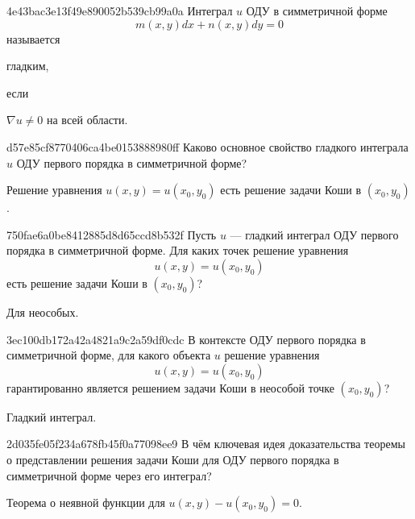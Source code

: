 \begin{note}{4e43bac3e13f49e890052b539cb99a0a}
    Интеграл \({ u }\) ОДУ в симметричной форме
    \[
        m(x, y) dx + n(x, y) dy = 0
    \]
    называется \begin{icloze}{2}гладким,\end{icloze} если \begin{icloze}{1}\({ \nabla u \neq 0 }\) на всей области.\end{icloze}
\end{note}

\begin{note}{d57e85cf8770406ca4be0153888980ff}
    Каково основное свойство гладкого интеграла \({ u }\) ОДУ первого порядка в симметричной форме?

    \begin{cloze}{1}
        Решение уравнения \({ u(x, y) = u(x_0, y_0) }\) есть решение задачи Коши в \({ (x_0, y_0) }\).
    \end{cloze}
\end{note}

\begin{note}{750fae6a0be8412885d8d65ccd8b532f}
    Пусть \({ u }\) --- гладкий интеграл ОДУ первого порядка в симметричной форме.
    Для каких точек решение уравнения
    \[
        u(x, y) = u(x_0, y_0)
    \]
    есть решение задачи Коши в \({ (x_0, y_0) }\)?

    \begin{cloze}{1}
        Для неособых.
    \end{cloze}
\end{note}

\begin{note}{3ec100db172a42a4821a9c2a59df0cdc}
    В контексте ОДУ первого порядка в симметричной форме, для какого объекта \({ u }\) решение уравнения
    \[
        u(x, y) = u(x_0, y_0)
    \]
    гарантированно является решением задачи Коши в неособой точке \({ (x_0, y_0) }\)?

    \begin{cloze}{1}
        Гладкий интеграл.
    \end{cloze}
\end{note}

\begin{note}{2d035fe05f234a678fb45f0a77098ee9}
    В чём ключевая идея доказательства теоремы о представлении решения задачи Коши для ОДУ первого порядка в симметричной форме через его интеграл?

    \begin{cloze}{1}
        Теорема о неявной функции для \({ u(x, y) - u(x_0, y_0) = 0 }\).
    \end{cloze}
\end{note}

